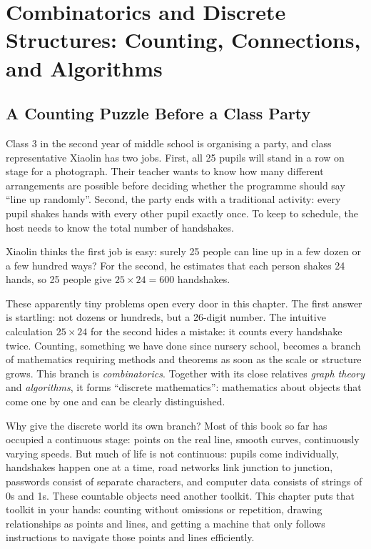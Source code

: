\chapter{Combinatorics and Discrete Structures: Counting, Connections, and Algorithms}

\section{A Counting Puzzle Before a Class Party}

Class 3 in the second year of middle school is organising a party, and class representative Xiaolin has two jobs. First, all 25 pupils will stand in a row on stage for a photograph. Their teacher wants to know how many different arrangements are possible before deciding whether the programme should say ``line up randomly''. Second, the party ends with a traditional activity: every pupil shakes hands with every other pupil exactly once. To keep to schedule, the host needs to know the total number of handshakes.

Xiaolin thinks the first job is easy: surely 25 people can line up in a few dozen or a few hundred ways? For the second, he estimates that each person shakes 24 hands, so 25 people give $25\times 24=600$ handshakes.

These apparently tiny problems open every door in this chapter. The first answer is startling: not dozens or hundreds, but a 26-digit number. The intuitive calculation $25\times24$ for the second hides a mistake: it counts every handshake twice. Counting, something we have done since nursery school, becomes a branch of mathematics requiring methods and theorems as soon as the scale or structure grows. This branch is \emph{combinatorics}. Together with its close relatives \emph{graph theory} and \emph{algorithms}, it forms ``discrete mathematics'': mathematics about objects that come one by one and can be clearly distinguished.

Why give the discrete world its own branch? Most of this book so far has occupied a continuous stage: points on the real line, smooth curves, continuously varying speeds. But much of life is not continuous: pupils come individually, handshakes happen one at a time, road networks link junction to junction, passwords consist of separate characters, and computer data consists of strings of 0s and 1s. These countable objects need another toolkit. This chapter puts that toolkit in your hands: counting without omissions or repetition, drawing relationships as points and lines, and getting a machine that only follows instructions to navigate those points and lines efficiently.

